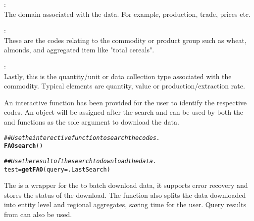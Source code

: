 \documentclass[nojss]{jss}\usepackage[]{graphicx}\usepackage[]{color}
\makeatletter
\newcommand{\hlcom}[1]{\textcolor[rgb]{0.678,0.584,0.686}{\textit{#1}}}%
\newcommand{\hlstd}[1]{\textcolor[rgb]{0.345,0.345,0.345}{#1}}%
\newcommand{\hlkwb}[1]{\textcolor[rgb]{0.69,0.353,0.396}{#1}}%
\newcommand{\hlkwc}[1]{\textcolor[rgb]{0.333,0.667,0.333}{#1}}%
\newcommand{\hlkwd}[1]{\textcolor[rgb]{0.737,0.353,0.396}{\textbf{#1}}}%
\newenvironment{kframe}{%
 \def\at@end@of@kframe{}%
 \ifinner\ifhmode%
  \def\at@end@of@kframe{\end{minipage}}%
  \begin{minipage}{\columnwidth}%
 \fi\fi%
 \def\FrameCommand##1{\hskip\@totalleftmargin \hskip-\fboxsep
 \colorbox{shadecolor}{##1}\hskip-\fboxsep
     \hskip-\linewidth \hskip-\@totalleftmargin \hskip\columnwidth}%
 \MakeFramed {\advance\hsize-\width
   \@totalleftmargin\z@ \linewidth\hsize
   \@setminipage}}%
 {\par\unskip\endMakeFramed%
 \at@end@of@kframe}
\newenvironment{knitrout}{}{} %
\makeatother
\begin{document}
\begin{itemize}
  {\setlength\itemindent{48pt}\item[Domain Code]: \hfill\\ The domain
    associated with the data. For example, production, trade, prices
    etc.}  {\setlength\itemindent{30pt}\item[Item Code]: \hfill\\
    These are the codes relating to the commodity or product group
    such as wheat, almonds, and aggregated item like "total cereals".}
  {\setlength\itemindent{49pt}\item[Element Code]: \hfill\\Lastly,
    this is the quantity/unit or data collection type associated with
    the commodity. Typical elements are quantity, value or
    production/extraction rate.}
\end{itemize}

An interactive function  has been provided for the user to identify the respective codes. An object  will be assigned after the search and can be used by both the  and  functions as the sole argument to download the data.

\begin{knitrout}
\color{fgcolor}\begin{kframe}
\begin{alltt}
\hlcom{## Use the interective function to search the codes.}
\hlkwd{FAOsearch}\hlstd{()}

\hlcom{## Use the result of the search to download the data.}
\hlstd{test} \hlkwb{=} \hlkwd{getFAO}\hlstd{(}\hlkwc{query} \hlstd{= .LastSearch)}
\end{alltt}
\end{kframe}
\end{knitrout}

The  is a wrapper for the  to batch download data, it supports error recovery and stores the status of the download. The function also splits the data downloaded into entity level and regional aggregates, saving time for the user. Query results from  can also be used.
\end{document}
